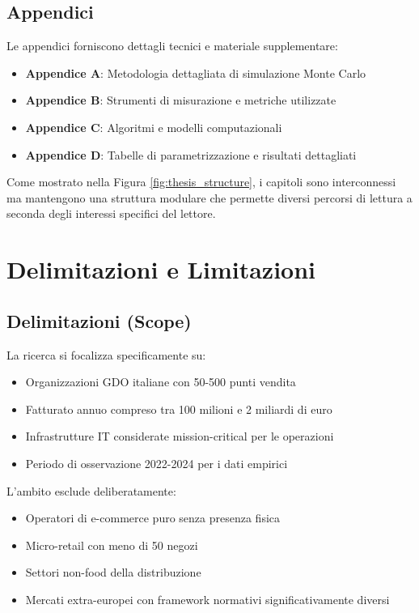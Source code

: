 \subsection{Appendici}

Le appendici forniscono dettagli tecnici e materiale supplementare:
\begin{itemize}
\item \textbf{Appendice A}: Metodologia dettagliata di simulazione Monte Carlo
\item \textbf{Appendice B}: Strumenti di misurazione e metriche utilizzate
\item \textbf{Appendice C}: Algoritmi e modelli computazionali
\item \textbf{Appendice D}: Tabelle di parametrizzazione e risultati dettagliati
\end{itemize}

Come mostrato nella Figura \ref{fig:thesis_structure}, i capitoli sono interconnessi ma mantengono una struttura modulare che permette diversi percorsi di lettura a seconda degli interessi specifici del lettore.

\section{Delimitazioni e Limitazioni}

\subsection{Delimitazioni (Scope)}

La ricerca si focalizza specificamente su:
\begin{itemize}
\item Organizzazioni GDO italiane con 50-500 punti vendita
\item Fatturato annuo compreso tra 100 milioni e 2 miliardi di euro
\item Infrastrutture IT considerate mission-critical per le operazioni
\item Periodo di osservazione 2022-2024 per i dati empirici
\end{itemize}

L'ambito esclude deliberatamente:
\begin{itemize}
\item Operatori di e-commerce puro senza presenza fisica
\item Micro-retail con meno di 50 negozi
\item Settori non-food della distribuzione
\item Mercati extra-europei con framework normativi significativamente diversi
\end{itemize}

